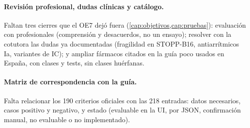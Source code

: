 \paragraph{Revisión profesional, dudas clínicas y catálogo.}
Faltan tres cierres que el OE7 dejó fuera (\cref{cap:objetivos,cap:pruebas}):
evaluación con profesionales (comprensión y desacuerdos, no un ensayo);
resolver con la cotutora las dudas ya documentadas (fragilidad en STOPP-B16,
antiarrítmicos Ia, variantes de IC); y ampliar fármacos citados en la guía
poco usados en España, con clases y tests, sin clases huérfanas.

\paragraph{Matriz de correspondencia con la guía.}
Falta relacionar los 190 criterios oficiales con las 218 entradas: datos
necesarios, casos positivo y negativo, y estado (evaluable en la UI, por
JSON, confirmación manual, no evaluable o no implementado).

